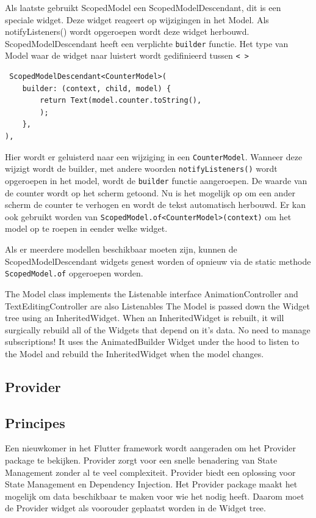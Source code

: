 Als laatste gebruikt ScopedModel een ScopedModelDescendant, dit is een speciale widget. Deze widget reageert op wijzigingen in het Model. Als notifyListeners() wordt opgeroepen wordt deze widget herbouwd.
ScopedModelDescendant heeft een verplichte \verb|builder| functie. Het type van Model waar de widget naar luistert wordt gedifinieerd tussen \verb|< >|
\begin{verbatim}
 ScopedModelDescendant<CounterModel>(
    builder: (context, child, model) {
        return Text(model.counter.toString(), 
        );
    },
),
\end{verbatim}
Hier wordt er geluisterd naar een wijziging in een \verb|CounterModel|. Wanneer deze wijzigt wordt de builder, met andere woorden \verb|notifyListeners()| wordt opgeroepen in het model, wordt de \verb|builder| functie aangeroepen. De waarde van de counter wordt op het scherm getoond. Nu is het mogelijk op om een ander scherm de counter te verhogen en wordt de tekst automatisch herbouwd. Er kan ook gebruikt worden van \verb|ScopedModel.of<CounterModel>(context)| om het model op te roepen in eender welke widget.

Als er meerdere modellen beschikbaar moeten zijn, kunnen de ScopedModelDescendant widgets genest worden of opnieuw via de static methode \verb|ScopedModel.of| opgeroepen worden.


The Model class implements the Listenable interface
AnimationController and TextEditingController are also Listenables
The Model is passed down the Widget tree using an InheritedWidget. When an InheritedWidget is rebuilt, it will surgically rebuild all of the Widgets that depend on it's data. No need to manage subscriptions!
It uses the AnimatedBuilder Widget under the hood to listen to the Model and rebuild the InheritedWidget when the model changes.

\subsection{Provider}
\subsection*{Principes}
Een nieuwkomer in het Flutter framework wordt aangeraden om het Provider package te bekijken. Provider zorgt voor een snelle benadering van State Management zonder al te veel complexiteit. Provider biedt een oplossing voor State Management en Dependency Injection.
Het Provider package maakt het mogelijk om data beschikbaar te maken voor wie het nodig heeft. Daarom moet de Provider widget als voorouder geplaatst worden in de Widget tree.

